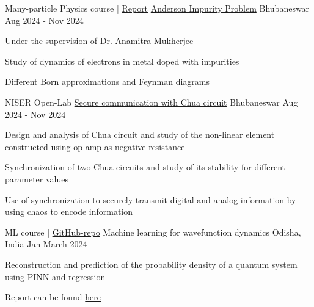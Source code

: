 

\begin{cventries}

\cventry
{Many-particle Physics course | \href{https://drive.google.com/file/d/1Gf_Eeht8ysXzUMMGgl5LR_zTFmUtr4z9/view?usp=drive_link}{Report}} %
{\href{}{Anderson Impurity Problem}} %
{Bhubaneswar} %
{Aug 2024 - Nov 2024} %
{
	\begin{cvitems} %
		\item{Under the supervision of \href{https://sites.google.com/site/workpagetemp}{Dr. Anamitra Mukherjee}}
		\item {Study of dynamics of electrons in metal doped with impurities}
		\item {Different Born approximations and Feynman diagrams}\\
	\end{cvitems}
}


\cventry
{NISER Open-Lab} %
{\href{}{Secure communication with Chua circuit}} %
{Bhubaneswar} %
{Aug 2024 - Nov 2024} %
{
	\begin{cvitems} %
		\item {Design and analysis of Chua circuit and study of the non-linear element constructed using op-amp as negative resistance}
		\item {Synchronization of two Chua circuits and study of its stability for different parameter values}
		\item {Use of synchronization to securely transmit digital and analog information by using chaos to encode information}\\
	\end{cvitems}
}

\cventry
{ML course | \href{https://github.com/smlab-niser/24cs460/tree/main/projects/Group1}{GitHub-repo}} %
{Machine learning for wavefunction dynamics} %
{Odisha, India} %
{Jan-March 2024} %
{
	\begin{cvitems} %
		\item{Reconstruction and prediction of the probability density of a quantum system using PINN and regression}
		\item{Report can be found \href{https://github.com/smlab-niser/24cs460/blob/main/projects/Group1/end-sem/final_report_cs460.pdf}{here}}\\
	\end{cvitems}
}


\end{cventries}
